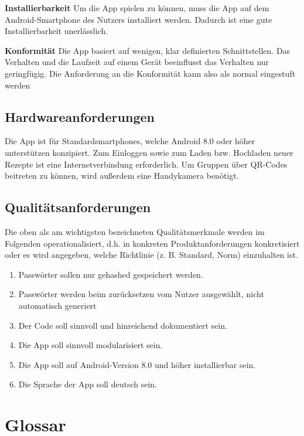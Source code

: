 \documentclass[parskip=full]{scrartcl}
\begin{document}
\textbf{Installierbarkeit}\newline
Um die App spielen zu können, muss die App auf dem Android-Smartphone des Nutzers installiert werden.
Dadurch ist eine gute Installierbarkeit unerlässlich.

\textbf{Konformität}\newline
Die App basiert auf wenigen, klar definierten Schnittstellen. Das Verhalten und die Laufzeit auf einem Gerät beeinflusst das Verhalten nur geringfügig. Die Anforderung an die Konformität kann also als normal eingestuft werden

\subsection{Hardwareanforderungen}
Die App ist für Standardsmartphones, welche Android 8.0 oder höher unterstützen konzipiert. Zum Einloggen sowie zum Laden bzw. Hochladen neuer Rezepte ist eine Internetverbindung erforderlich. Um Gruppen über QR-Codes beitreten zu können, wird außerdem eine Handykamera benötigt.


\subsection{Qualitätsanforderungen}
Die oben als am wichtigsten bezeichneten Qualitätsmerkmale werden im Folgenden operationalisiert, d.h. in konkreten Produktanforderungen konkretisiert oder es wird angegeben, welche Richtlinie (z. B. Standard, Norm) einzuhalten ist.

\begin{enumerate}[start=1,label={$\langle$\bfseries Q\arabic*$\rangle$}, leftmargin = 5em, itemsep=4pt, parsep=4pt]
    \item Passwörter sollen nur gehashed gespeichert werden.
    \item Passwörter werden beim zurücksetzen vom Nutzer ausgewählt, nicht automatisch generiert
    \item Der Code soll sinnvoll und hinreichend dokumentiert sein.
    \item Die App soll sinnvoll modularisiert sein.
    \item Die App soll auf Android-Version 8.0 und höher installierbar sein.
    \item Die Sprache der App soll deutsch sein.
\end{enumerate}

\section{Glossar}
\printglossary[type=\acronymtype]
\end{document}
